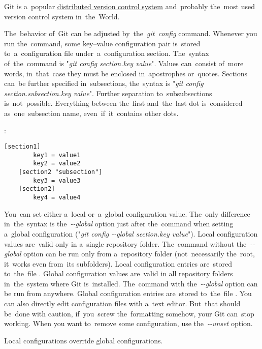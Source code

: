 \label{git}
Git is a~popular \hyperref[distributedversioncontrolsystem]{distributed version control system} and~probably the~most used version control system in~the~World.

The~behavior of~Git can be adjusted by~the~\textit{git~config} command. Whenever you run the~command, some key--value configuration pair is~stored to~a~configuration file under~a~configuration section. The~syntax of~the~command is "\textit{git config section.key value}". Values can~consist of~more words, in~that~case they must be enclosed in~apostrophes or~quotes. Sections can~be further specified in~subsections, the~syntax is "\textit{git config section.subsection.key value}". Further separation to~subsubsections is~not~possible. Everything between the~first and~the~last dot is~considered as~one~subsection name, even~if~it~contains other dots.

:
\begin{lstlisting}[frame=no]
    [section1]
        key1 = value1
        key2 = value2
    [section2 "subsection"]
        key3 = value3
    [section2]
        key4 = value4
\end{lstlisting}

\noindent  You~can set either a~local or~a~global configuration value. The~only difference in~the~syntax is the~\textit{-{}-global} option just after the~command when setting a~global configuration ("\textit{git config -{}-global section.key value}"). Local configuration values are~valid only in a~single repository folder. The~command without the~\textit{-{}-global} option can be run only from a~repository folder (not~necessarily the~root, it~works even from~its subfolders). Local configuration entries are~stored to~the~file . Global configuration values are~valid in all repository folders in~the~system where Git is~installed. The~command with the~\textit{-{}-global} option can be run from anywhere. Global configuration entries are~stored to~the~file . You can also directly edit configuration files with a~text editor. But~that should be~done with caution, if~you~screw the~formatting somehow, your Git can~stop working. When you want to~remove some configuration, use the~\textit{-{}-unset} option.

\warning Local configurations override global configurations.


